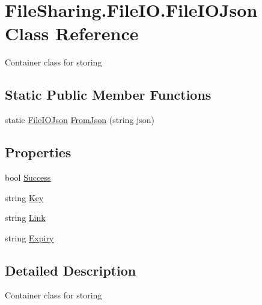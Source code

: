 \hypertarget{class_file_sharing_1_1_file_i_o_1_1_file_i_o_json}{}\section{File\+Sharing.\+File\+I\+O.\+File\+I\+O\+Json Class Reference}
\label{class_file_sharing_1_1_file_i_o_1_1_file_i_o_json}


Container class for storing  


\subsection*{Static Public Member Functions}
\begin{DoxyCompactItemize}
\item 
static \hyperlink{class_file_sharing_1_1_file_i_o_1_1_file_i_o_json}{File\+I\+O\+Json} \hyperlink{class_file_sharing_1_1_file_i_o_1_1_file_i_o_json_a7e8f33aa7c9d66c387fda361fb6c5039}{From\+Json} (string json)
\end{DoxyCompactItemize}
\subsection*{Properties}
\begin{DoxyCompactItemize}
\item 
bool \hyperlink{class_file_sharing_1_1_file_i_o_1_1_file_i_o_json_aa9fc3b728d692a00a66c89356415b2e1}{Success}
\item 
string \hyperlink{class_file_sharing_1_1_file_i_o_1_1_file_i_o_json_ab3cad513a9f6e9ce435c907e6445191b}{Key}
\item 
string \hyperlink{class_file_sharing_1_1_file_i_o_1_1_file_i_o_json_a810fc7c3fee999a9790bc0bf090e3bd9}{Link}
\item 
string \hyperlink{class_file_sharing_1_1_file_i_o_1_1_file_i_o_json_a8df4a50df509b40abf0ab34477f479b3}{Expiry}
\end{DoxyCompactItemize}


\subsection{Detailed Description}
Container class for storing 



